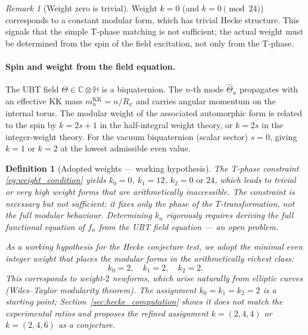 \documentclass[12pt,a4paper]{article}
\newtheorem{definition}[theorem]{Definition}
\theoremstyle{remark}
\newtheorem{remark}[theorem]{Remark}
\newcommand{\C}{\mathbb{C}}
\begin{document}
\begin{remark}[Weight zero is trivial]
Weight $k=0$ (and $k=0 \pmod{24}$) corresponds to a constant modular form,
which has trivial Hecke structure.  This signals that the simple T-phase
matching is not sufficient; the actual weight must be determined from the
spin of the field excitation, not only from the T-phase.
\end{remark}

\paragraph{Spin and weight from the field equation.}
The UBT field $\Theta\in\C\otimes\mathbb{H}$ is a biquaternion.
The $n$-th mode $\hat\Theta_n$ propagates with an effective KK mass
$m_n^{\mathrm{KK}} = n/R_\psi$ and carries angular momentum on the
internal torus.  The modular weight of the associated automorphic form is
related to the spin by $k = 2s+1$ in the half-integral weight theory, or
$k = 2s$ in the integer-weight theory.  For the vacuum biquaternion
(scalar sector) $s=0$, giving $k=1$ or $k=2$ at the lowest admissible even value.

\begin{definition}[Adopted weights — working hypothesis]
\label{def:weights}
The T-phase constraint \eqref{eq:weight_condition} yields $k_0=0$, $k_1=12$,
$k_2=0\text{ or }24$, which leads to trivial or very high weight forms that are
arithmetically inaccessible.  The constraint is \emph{necessary but not sufficient}:
it fixes only the phase of the $T$-transformation, not the full modular behaviour.
Determining $k_n$ rigorously requires deriving the full functional equation of
$f_n$ from the UBT field equation — an open problem.

As a \emph{working hypothesis} for the Hecke conjecture test, we adopt the
\emph{minimal even integer weight} that places the modular forms in the
arithmetically richest class:
\begin{equation}
  \label{eq:weights}
  k_0 = 2,\quad k_1 = 2,\quad k_2 = 2.
\end{equation}
This corresponds to weight-$2$ newforms, which arise naturally from elliptic
curves (Wiles--Taylor modularity theorem).  The assignment $k_0=k_1=k_2=2$ is
a starting point; Section~\ref{sec:hecke_computation} shows it does not match
the experimental ratios and proposes the refined assignment $k=(2,4,4)$ or
$k=(2,4,6)$ as a \emph{conjecture}.
\end{definition}
\end{document}
